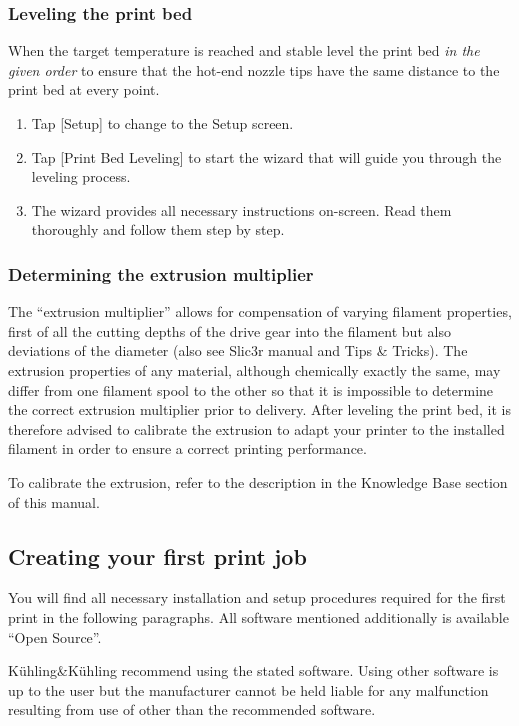 \subsubsection{Leveling the print bed}

When the target temperature is reached and stable level the print bed \emph{in the given order} to ensure that the hot-end nozzle tips have the same distance to the print bed at every point.

\begin{enumerate}
  \item Tap [Setup] to change to the Setup screen.
  \item Tap [Print Bed Leveling] to start the wizard that will guide you through the 
        leveling process.
  \item The wizard provides all necessary instructions on-screen. Read them thoroughly 
        and follow them step by step.
\end{enumerate}

\subsubsection{Determining the extrusion multiplier}

The “extrusion multiplier” allows for compensation of varying filament properties, first of all the cutting depths of the drive gear into the filament but also deviations of the diameter (also see Slic3r manual and Tips \& Tricks). The extrusion properties of any material, although chemically exactly the same, may differ from one filament spool to the other so that it is impossible to determine the correct extrusion multiplier prior to delivery. After leveling the print bed, it is therefore advised to calibrate the extrusion to adapt your printer to the installed filament in order to ensure a correct printing performance. 

To calibrate the extrusion, refer to the description in the Knowledge Base section of this manual.

\subsection{Creating your first print job}

You will find all necessary installation and setup procedures required for the first print in the following paragraphs. All software mentioned additionally is available “Open Source”. 

\begin{info}
  Kühling\&Kühling recommend using the stated software. Using other software is up to the user but the manufacturer cannot be held liable for any malfunction resulting from use of other than the recommended software.
\end{info}

